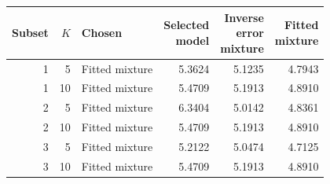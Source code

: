 \begin{tabular}{rrlrrr}
\toprule
Subset & $K$ & Chosen & \shortstack[r]{Selected\\model} & \shortstack[r]{Inverse\\error\\mixture} & \shortstack[r]{Fitted\\mixture} \\
\midrule
1 & 5 & Fitted mixture & 5.3624 & 5.1235 & 4.7943 \\
1 & 10 & Fitted mixture & 5.4709 & 5.1913 & 4.8910 \\
2 & 5 & Fitted mixture & 6.3404 & 5.0142 & 4.8361 \\
2 & 10 & Fitted mixture & 5.4709 & 5.1913 & 4.8910 \\
3 & 5 & Fitted mixture & 5.2122 & 5.0474 & 4.7125 \\
3 & 10 & Fitted mixture & 5.4709 & 5.1913 & 4.8910 \\
\bottomrule
\end{tabular}
